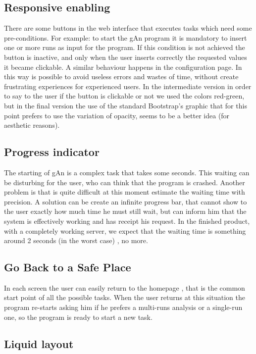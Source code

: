 \subsection{Responsive enabling}
There are some buttons in the web interface that executes tasks which need some pre-conditions. For example: to start the gAn program it is mandatory to insert one or more runs as input for the program. If this condition is not achieved the button is inactive, and only when the user inserts correctly the requested values it became clickable. A similar behaviour happens in the configuration page. In this way is possible to avoid useless errors and wastes of time, without create frustrating experiences for experienced users. In the intermediate version in order to say to the user if the button is clickable or not we used the colors red-green, but in the final version the use of the standard Bootstrap's graphic that for this point prefers to use the variation of opacity, seems to be a better idea (for aesthetic reasons).   

\subsection{Progress indicator}
The starting of gAn is a complex task that takes some seconds. This waiting can be disturbing for the user, who can think that the program is crashed. Another problem is that is quite difficult at this moment estimate the waiting time with precision. A solution can be create an infinite progress bar, that cannot show to the user exactly how much time he must still wait, but can inform him that the system is effectively working and has receipt his request. In the finished product, with a completely working server, we expect that the waiting time is something around 2 seconds (in the worst case) , no more. 

\subsection{Go Back to a Safe Place}
In each screen the user can easily return to the homepage , that is the common start point of all the possible tasks. When the user returns at this situation the program re-starts asking him if he prefers a multi-runs analysis or a single-run one, so the program is ready to start a new task. 

\subsection{Liquid layout}

